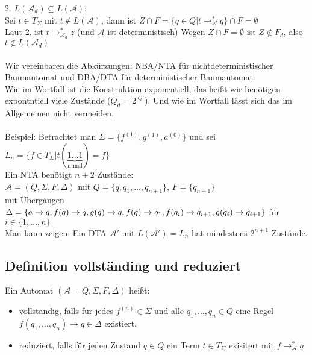 \documentclass[titlepage]{article}
\begin{document}
2. \glqq$L(\mathcal{A}_d) \subseteq L(\mathcal{A})$\grqq:\\

Sei $t \in T_\Sigma$ mit $t \notin L(\mathcal{A})$, 
dann ist $Z \cap F = \{ q \in Q | t \rightarrow^\ast_\mathcal{A} q \} \cap F = \emptyset$\\
Laut 2. ist $t \rightarrow ^\ast_{\mathcal{A}_d} z$ (und $\mathcal{A}$ ist deterministisch)
Wegen $Z \cap F = \emptyset$ ist $Z \notin F_d$, also $t \notin L(\mathcal{A}_d)$ \\ \\

Wir vereinbaren die Abk\"urzungen: NBA/NTA f\"ur nichtdeterministischer Baumautomat 
und DBA/DTA f\"ur deterministischer Baumautomat.\\
Wie im Wortfall ist die Konstruktion exponentiell, das hei\ss t wir ben\"otigen 
expontntiell viele Zust\"ande ($Q_d = 2^{|Q|}$).
Und wie im Wortfall l\"asst sich das im Allgemeinen nicht vermeiden.\\ \\
Beispiel: Betrachtet man $\Sigma = \{ f^{(1)}, g^{(1)}, a^{(0)}\}$ und
sei $L_n = \{ f \in T_\Sigma | t( \underbrace{1 \dots 1}_\text{n-mal} ) = f \}$ \\

Ein NTA ben\"otigt $n+2$ Zust\"ande:\\
$\mathcal{A} = (Q, \Sigma, F, \Delta)$ mit $Q = \{q, q_1, \dots , q_{n+1} \}$, 
$F = \{q_{n+1}\}$ \\ mit \"Uberg\"angen
$\Delta = \{a \rightarrow q, f(q) \rightarrow q, g(q) \rightarrow q, f(q) \rightarrow q_1, \\
f(q_i) \rightarrow q_{i+1}, g(q_i) \rightarrow q_{i+1} \}$ f\"ur $i \in \{1, \dots ,n\}$\\

Man kann zeigen: Ein DTA $\mathcal{A}'$ mit $L(\mathcal{A}') = L_n$ hat mindestens 
$2^{n+1}$ Zust\"ande.

\subsection{Definition vollst\"anding und reduziert}

Ein Automat $(\mathcal{A} = Q, \Sigma, F, \Delta)$ hei\ss t:

\begin{itemize}
	\item vollst\"andig, falls f\"ur jedes $f^{(n)} \in \Sigma$ und alle 
		$q_1, \dots , q_n \in Q$ eine Regel 
		$f(q_1, \dots, q_n) \rightarrow q \in \Delta$ existiert.
	\item reduziert, falls f\"ur jeden Zustand $q \in Q$ ein Term $t \in T_\Sigma$ 
		exisitert mit $f \rightarrow ^\ast_\mathcal{A} q$
\end{itemize}
\end{document}

